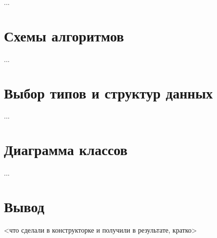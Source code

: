 ...

\section{Схемы алгоритмов}

...

\section{Выбор типов и структур данных}

...

\section{Диаграмма классов}

...

\section{Вывод}

<что сделали в конструкторке и получили в результате, кратко>

\clearpage
